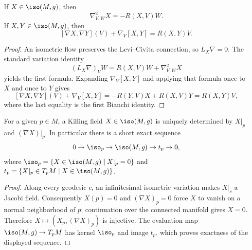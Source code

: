 \begin{proposition}
  \label{prop:pet-ch8-killing-curvature-identities}
  If $X\in\iso(M,g)$, then
  \[
    \nabla^2_{V,W}X=-R(X,V)W.
  \]
  If $X,Y\in\iso(M,g)$, then
  \[
    [\nabla X,\nabla Y](V)+\nabla_V[X,Y]=R(X,Y)V.
  \]
\end{proposition}
\begin{proof}
  \sketch
  An isometric flow preserves the Levi--Civita connection, so
  \(L_X\nabla=0\). The standard variation identity
  \[
    (L_X\nabla)_VW=R(X,V)W+\nabla^2_{V,W}X
  \]
  yields the first formula. Expanding \(\nabla_V[X,Y]\) and applying that
  formula once to \(X\) and once to \(Y\) gives
  \[
    [\nabla X,\nabla Y](V)+\nabla_V[X,Y]
    =-R(Y,V)X+R(X,V)Y=R(X,Y)V,
  \]
  where the last equality is the first Bianchi identity.
\end{proof}

\begin{proposition}
  \label{prop:pet-ch8-killing-uniqueness}
  For a given $p\in M$, a Killing field $X\in\iso(M,g)$ is uniquely determined by
  $X|_p$ and $(\nabla X)|_p$. In particular there is a short exact sequence
  \[
    0\to\iso_p\to\iso(M,g)\to t_p\to0,
  \]
  where $\iso_p=\{X\in\iso(M,g)\mid X|_p=0\}$ and
  $t_p=\{X|_p\in T_pM\mid X\in\iso(M,g)\}$.
\end{proposition}
\begin{proof}
  \sketch
  Along every geodesic \(c\), an infinitesimal isometric variation makes
  \(X|_c\) a Jacobi field. Consequently \(X(p)=0\) and
  \((\nabla X)_p=0\) force \(X\) to vanish on a normal neighborhood of \(p\);
  continuation over the connected manifold gives \(X=0\). Therefore
  \(X\mapsto(X_p,(\nabla X)_p)\) is injective. The evaluation map
  \(\iso(M,g)\to T_pM\) has kernel \(\iso_p\) and image \(t_p\), which proves
  exactness of the displayed sequence.
\end{proof}


